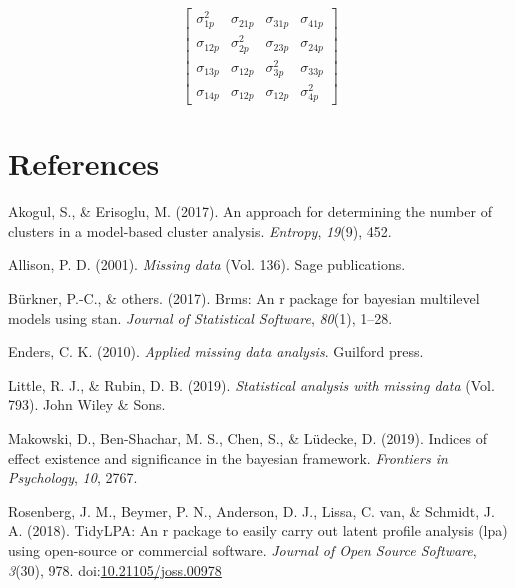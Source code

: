 \documentclass[man]{apa6}
\begin{document}
\[
\left[ \begin{matrix} { \sigma  }_{ 1p }^{ 2 } & { \sigma  }_{ 21p } & { \sigma  }_{ 31p } & { \sigma  }_{ 41p } \\ { \sigma  }_{ 12p } & { \sigma  }_{ 2p }^{ 2 } & { \sigma  }_{ 23p } & { \sigma  }_{ 24p } \\ { \sigma  }_{ 13p } & { \sigma  }_{ 12p } & { \sigma  }_{ 3p }^{ 2 } & { \sigma  }_{ 33p } \\ { \sigma  }_{ 14p } & { \sigma  }_{ 12p } & { \sigma  }_{ 12p } & { \sigma  }_{ 4p }^{ 2 } \end{matrix} \right] 
\]

\hypertarget{references}{%
\section{References}\label{references}}

\begingroup
\setlength{\parindent}{-0.5in}
\setlength{\leftskip}{0.5in}

\hypertarget{refs}{}
\leavevmode\hypertarget{ref-akogul2017approach}{}%
Akogul, S., \& Erisoglu, M. (2017). An approach for determining the number of clusters in a model-based cluster analysis. \emph{Entropy}, \emph{19}(9), 452.

\leavevmode\hypertarget{ref-allison2001missing}{}%
Allison, P. D. (2001). \emph{Missing data} (Vol. 136). Sage publications.

\leavevmode\hypertarget{ref-burkner2017}{}%
Bürkner, P.-C., \& others. (2017). Brms: An r package for bayesian multilevel models using stan. \emph{Journal of Statistical Software}, \emph{80}(1), 1--28.

\leavevmode\hypertarget{ref-enders2010applied}{}%
Enders, C. K. (2010). \emph{Applied missing data analysis}. Guilford press.

\leavevmode\hypertarget{ref-little2019statistical}{}%
Little, R. J., \& Rubin, D. B. (2019). \emph{Statistical analysis with missing data} (Vol. 793). John Wiley \& Sons.

\leavevmode\hypertarget{ref-makowski2019}{}%
Makowski, D., Ben-Shachar, M. S., Chen, S., \& Lüdecke, D. (2019). Indices of effect existence and significance in the bayesian framework. \emph{Frontiers in Psychology}, \emph{10}, 2767.

\leavevmode\hypertarget{ref-R-tidyLPA}{}%
Rosenberg, J. M., Beymer, P. N., Anderson, D. J., Lissa, C. van, \& Schmidt, J. A. (2018). TidyLPA: An r package to easily carry out latent profile analysis (lpa) using open-source or commercial software. \emph{Journal of Open Source Software}, \emph{3}(30), 978. doi:\href{https://doi.org/10.21105/joss.00978}{10.21105/joss.00978}
\end{document}
